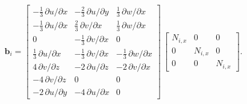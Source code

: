 \begin{equation}
\mathbf{b}_i = \begin{bmatrix}
-\tfrac{1}{3} \, \partial u / \partial x &  - \tfrac{2}{3} \, \partial u / \partial y & \tfrac{1}{3} \, \partial w / \partial x  \\
-\tfrac{1}{3} \, \partial u / \partial x &  \tfrac{2}{3} \, \partial v / \partial x & \tfrac{1}{3} \, \partial w / \partial x  \\
0  & -\tfrac{1}{3} \, \partial v / \partial x & 0 \\
\tfrac{1}{3} \, \partial u / \partial x &  - \tfrac{1}{3} \, \partial v / \partial x & - \tfrac{1}{3} \, \partial w / \partial x  \\
4 \, \partial v / \partial z &  - 2 \, \partial u / \partial z & - 2 \,  \partial v / \partial x  \\
- 4 \, \partial v / \partial z &  0 & 0  \\
- 2 \, \partial u / \partial y &   - 4 \, \partial u / \partial x & 0   \end{bmatrix}  \, \begin{bmatrix}
N_{i,x} &  0 & 0  \\
0 & N_{i,x} & 0  \\
0 & 0 & N_{i,x} \end{bmatrix}. 
\end{equation}

